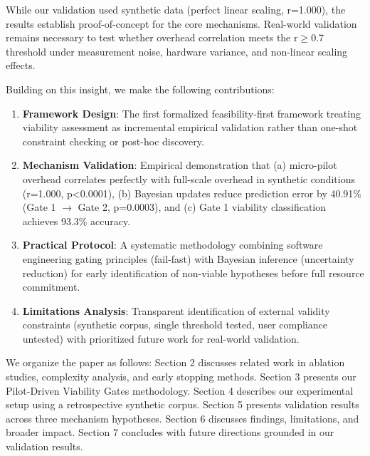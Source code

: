While our validation used synthetic data (perfect linear scaling, r=1.000), the results establish proof-of-concept for the core mechanisms. Real-world validation remains necessary to test whether overhead correlation meets the r$\geq$0.7 threshold under measurement noise, hardware variance, and non-linear scaling effects.

Building on this insight, we make the following contributions:

\begin{enumerate}
\item \textbf{Framework Design}: The first formalized feasibility-first framework treating viability assessment as incremental empirical validation rather than one-shot constraint checking or post-hoc discovery.

\item \textbf{Mechanism Validation}: Empirical demonstration that (a) micro-pilot overhead correlates perfectly with full-scale overhead in synthetic conditions (r=1.000, p<0.0001), (b) Bayesian updates reduce prediction error by 40.91\% (Gate 1 $\rightarrow$ Gate 2, p=0.0003), and (c) Gate 1 viability classification achieves 93.3\% accuracy.

\item \textbf{Practical Protocol}: A systematic methodology combining software engineering gating principles (fail-fast) with Bayesian inference (uncertainty reduction) for early identification of non-viable hypotheses before full resource commitment.

\item \textbf{Limitations Analysis}: Transparent identification of external validity constraints (synthetic corpus, single threshold tested, user compliance untested) with prioritized future work for real-world validation.
\end{enumerate}

We organize the paper as follows: Section 2 discusses related work in ablation studies, complexity analysis, and early stopping methods. Section 3 presents our Pilot-Driven Viability Gates methodology. Section 4 describes our experimental setup using a retrospective synthetic corpus. Section 5 presents validation results across three mechanism hypotheses. Section 6 discusses findings, limitations, and broader impact. Section 7 concludes with future directions grounded in our validation results.
